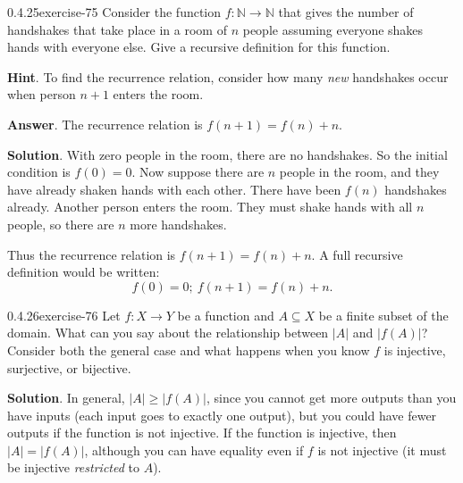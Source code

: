 \documentclass[twoside,11pt,]{book}
\numberwithin{equation}{chapter}
\newcommand{\N}{\mathbb N}
\newcommand{\card}[1]{\left| #1 \right|}
\begin{document}
\begin{divisionsolution}{0.4.25}{}{exercise-75}%
\hypertarget{p-1150}{}%
Consider the function \(f:\N \to \N\) that gives the number of handshakes that take place in a room of \(n\) people assuming everyone shakes hands with everyone else. Give a recursive definition for this function.%
\par\smallskip%
\noindent\textbf{Hint}.\quad%
\hypertarget{p-1151}{}%
To find the recurrence relation, consider how many \emph{new} handshakes occur when person \(n+1\) enters the room.%
\par\smallskip%
\noindent\textbf{Answer}.\quad%
\hypertarget{p-1152}{}%
The recurrence relation is \(f(n+1) = f(n) + n\).%
\par\smallskip%
\noindent\textbf{Solution}.\quad%
\hypertarget{p-1153}{}%
With zero people in the room, there are no handshakes. So the initial condition is \(f(0) = 0\). Now suppose there are \(n\) people in the room, and they have already shaken hands with each other. There have been \(f(n)\) handshakes already. Another person enters the room. They must shake hands with all \(n\) people, so there are \(n\) more handshakes.%
\par
\hypertarget{p-1154}{}%
Thus the recurrence relation is \(f(n+1) = f(n) + n\). A full recursive definition would be written:%
\begin{equation*}
f(0) = 0;~ f(n+1) = f(n) + n\text{.}
\end{equation*}
%
\end{divisionsolution}%
\begin{divisionsolution}{0.4.26}{}{exercise-76}%
\hypertarget{p-1155}{}%
Let \(f:X \to Y\) be a function and \(A \subseteq X\) be a finite subset of the domain. What can you say about the relationship between \(\card{A}\) and \(\card{f(A)}\)? Consider both the general case and what happens when you know \(f\) is injective, surjective, or bijective.%
\par\smallskip%
\noindent\textbf{Solution}.\quad%
\hypertarget{p-1156}{}%
In general, \(\card{A} \ge \card{f(A)}\), since you cannot get more outputs than you have inputs (each input goes to exactly one output), but you could have fewer outputs if the function is not injective. If the function is injective, then \(\card{A} = \card{f(A)}\), although you can have equality even if \(f\) is not injective (it must be injective \emph{restricted} to \(A\)).%
\end{divisionsolution}%
\end{document}
